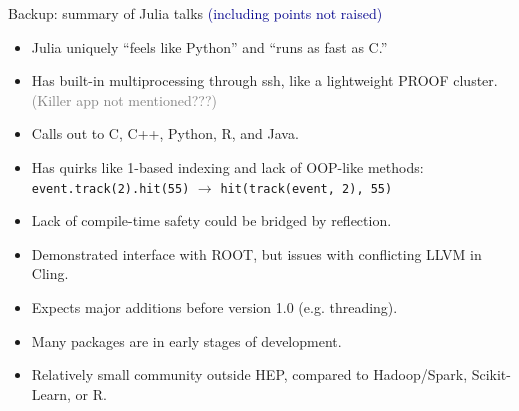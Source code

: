 \documentclass{beamer}
\begin{document}
\begin{frame}{Backup: summary of Julia talks}
\vspace{0.25 cm}
\textcolor{darkblue}{(including points not raised)}

\vfill

\begin{itemize}
\item Julia uniquely ``feels like Python'' and ``runs as fast as C.''
\item Has built-in multiprocessing through ssh, like a lightweight PROOF cluster. \textcolor{gray}{(Killer app not mentioned???)}
\item Calls out to C, C++, Python, R, and Java.
\item Has quirks like 1-based indexing and lack of OOP-like methods: {\tt \scriptsize event.track(2).hit(55)} $\to$ {\tt \scriptsize hit(track(event, 2), 55)}
\item Lack of compile-time safety could be bridged by reflection.
\item Demonstrated interface with ROOT, but issues with conflicting LLVM in Cling.
\item Expects major additions before version 1.0 (e.g. threading).
\item Many packages are in early stages of development.
\item Relatively small community outside HEP, compared to Hadoop/Spark, Scikit-Learn, or R.
\end{itemize}
\end{frame}
\end{document}
